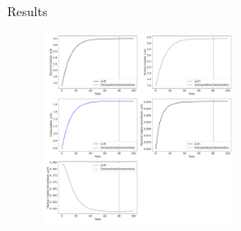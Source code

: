 \documentclass[aspectratio=169,10pt]{beamer}
\begin{document}
\begin{frame}{Results}
		\begin{figure}[t!]
		\centering
		\includegraphics[width=0.5\textwidth]{figs/human_capital.pdf}
		\vspace{-4mm}
	\end{figure}
\end{frame}
\end{document}
